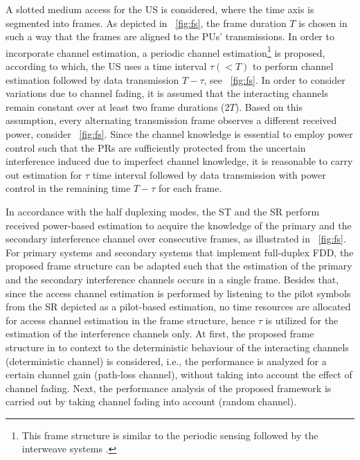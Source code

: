 A slotted medium access for the US is considered, where the time axis is segmented into frames. As depicted in \figurename~\ref{fig:fs}, the frame duration $T$ is chosen in such a way that the frames are aligned to the PUs' transmissions. In order to incorporate channel estimation, a periodic channel estimation\footnote{This frame structure is similar to the periodic sensing followed by the interweave systems \cite{Liang08}.} is proposed, according to which, the US uses a time interval $\tau (< T)$ to perform channel estimation followed by data transmission $T- \tau$, see \figurename~\ref{fig:fs}. In order to consider variations due to channel fading, it is assumed that the interacting channels remain constant over at least two frame durations ($2T$). Based on this assumption, every alternating transmission frame observes a different received power, consider \figurename~\ref{fig:fs}. Since the channel knowledge is essential to employ power control such that the PRs are sufficiently protected from the uncertain interference induced due to imperfect channel knowledge, it is reasonable to carry out estimation for $\tau$ time interval followed by data transmission with power control in the remaining time $T - \tau$ for each frame. %

In accordance with the half duplexing modes, the ST and the SR perform received power-based estimation to acquire the knowledge of the primary and the secondary interference channel over consecutive frames, as illustrated in \figurename~\ref{fig:fs}. For primary systems and secondary systems that implement full-duplex FDD, the proposed frame structure can be adapted such that the estimation of the primary and the secondary interference channels occurs in a single frame. Besides that, since the access channel estimation is performed by listening to the pilot symbols from the SR depicted as a pilot-based estimation, no time resources are allocated for access channel estimation in the frame structure, hence $\tau$ is utilized for the estimation of the interference channels only. 
At first, the proposed frame structure in to context to the deterministic behaviour of the interacting channels (deterministic channel) is considered, i.e., the performance is analyzed for a certain channel gain (path-loss channel), without taking into account the effect of channel fading. Next, the performance analysis of the proposed framework is carried out by taking channel fading into account (random channel). %



